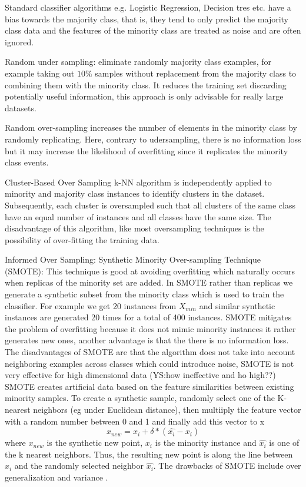 \documentclass[11pt]{article}
\begin{document}
Standard classifier algorithms e.g. Logistic Regression, Decision tres etc. have a bias towards the majority class, that is, they tend to only predict the majority class data and the features of the minority class are treated as noise and are often ignored. 


Random under sampling: eliminate randomly majority class examples, for example taking out $10\%$ samples without replacement from the majority class to combining them with the minority class. It reduces the training set discarding potentially useful information, this approach is only advisable for really large datasets.

Random over-sampling increases the number of elements in the minority class by randomly replicating. Here, contrary to udersampling, there is no information loss but it may increase the likelihood of overfitting since it replicates the minority class events.

Cluster-Based Over Sampling k-NN algorithm is independently applied to minority and majority class instances to identify clusters in the dataset. Subsequently, each cluster is oversampled such that all clusters of the same class have an equal number of instances and all classes have the same size. The disadvantage of this algorithm, like most oversampling techniques is the possibility of over-fitting the training data.  

Informed Over Sampling: Synthetic Minority Over-sampling Technique (SMOTE): This technique is good at avoiding overfitting which naturally occurs when replicas of the minority set are added. In SMOTE rather than replicas we generate a synthetic subset from the minority class which is used to train the classifier. For example we get 20 instances from $X_{min}$ and similar synthetic instances are generated 20 times for a total of 400 instances. SMOTE mitigates the problem of overfitting because it does not mimic minority instances it rather generates new ones, another advantage is that the there is no information loss.
The disadvantages of SMOTE are that the algorithm does not take into account neighboring examples across classes which could introduce noise, SMOTE is not very effective for high dimensional data (YS:how ineffective and ho high??)
SMOTE creates artificial data based on the feature similarities between existing minority samples. To create a synthetic sample, randomly select one of the K-nearest neighbors (eg under Euclidean distance), then multiiply the feature vector with a random number between 0 and 1 and finally add this vector to x
\begin{equation}
x_{new} =  x_i + \delta * (\hat{x_i} - x_i)
\end{equation}
where $x_{new}$ is the synthetic new point, $x_i$ is the minority instance and $\hat{x_i}$ is one of the k nearest neighbors. Thus, the resulting new point is along the line between $x_i$ and the randomly selected neighbor $\hat{x_i}$. The drawbacks of SMOTE include over generalization and variance \cite{wang2004imbalanced}.
\end{document}
